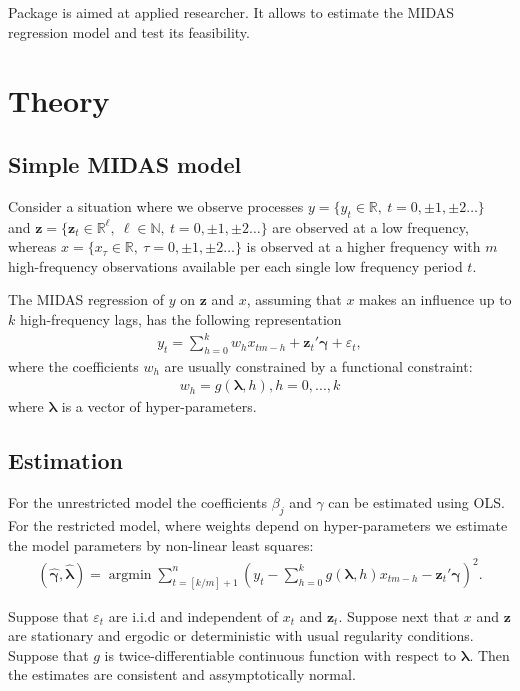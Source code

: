 \documentclass[nojss]{jss}
\DeclareMathOperator{\argmin}{argmin}
\begin{document}
Package  is aimed at applied researcher. It allows to
estimate the MIDAS regression model and test its feasibility.


\section{Theory}

\subsection{Simple MIDAS model}

Consider a situation where we observe processes $y=\{y_t\in
\mathbb{R}, \ t=0,\pm 1,\pm 2\dots\}$  and $\bm{z}=\{\bm{z}_t\in {\mathbb R^\ell}, \ \ell\in\mathbb{N}, \ t=0,\pm 1,\pm 2\dots\}$ are observed at a low frequency, whereas $x=\{x_\tau\in {\mathbb R}, \ \tau=0, \pm 1, \pm2 \dots\}$ is observed at a higher frequency with $m$ high-frequency observations available per each single low frequency period $t$.

The MIDAS regression of $y$ on $\bm{z}$ and $x$, assuming that $x$ makes an
influence up to $k$ high-frequency lags, has the following representation
\begin{align} \label{eq:1}
  y_t=\sum_{h=0}^{k}w_hx_{tm-h}+\bm{z}_t'\bm{\gamma}+\varepsilon_t, 
\end{align}
where the coefficients $w_h$ are usually constrained by a functional constraint:
\begin{align}\label{eq:weights}
  w_h=g(\bm{\lambda},h), h=0,...,k
\end{align}
where $\bm{\lambda}$ is a vector of hyper-parameters.

\subsection{Estimation}

For the unrestricted model the coefficients $\beta_j$ and $\gamma$ can
be estimated using OLS. For the restricted model, where weights depend
on hyper-parameters we estimate the model parameters by non-linear
least squares:
\begin{align}\label{e:nls}
  (\hat{\bm{\gamma}},\hat{\bm{\lambda}})=\argmin\sum_{t=[k/m]+1}^{n}\left(y_t-\sum_{h=0}^{k}g(\bm{\lambda},h)x_{tm-h}-\bm{z}_t'\bm{\gamma}\right)^2.
\end{align}

Suppose that $\varepsilon_t$ are i.i.d and independent of
$x_t$ and $\bm{z}_t$. Suppose next that $x$ and $\bm{z}$ are
stationary and ergodic or deterministic with usual regularity
conditions. Suppose that $g$ is twice-differentiable continuous
function with respect to $\bm{\lambda}$. Then the estimates are
consistent and assymptotically normal.
\end{document}
